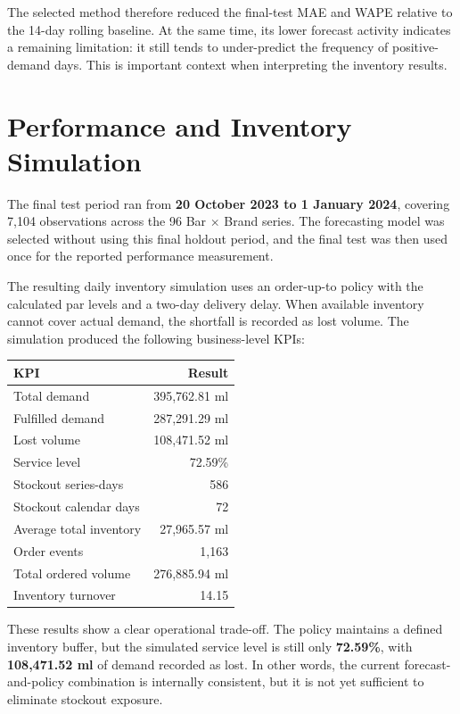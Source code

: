 \documentclass[11pt,a4paper]{article}
\begin{document}
The selected method therefore reduced the final-test MAE and WAPE relative to the 14-day rolling baseline. At the same time, its lower forecast activity indicates a remaining limitation: it still tends to under-predict the frequency of positive-demand days. This is important context when interpreting the inventory results.

\section{Performance and Inventory Simulation}

The final test period ran from \textbf{20 October 2023 to 1 January 2024}, covering 7,104 observations across the 96 Bar $\times$ Brand series. The forecasting model was selected without using this final holdout period, and the final test was then used once for the reported performance measurement.

The resulting daily inventory simulation uses an order-up-to policy with the calculated par levels and a two-day delivery delay. When available inventory cannot cover actual demand, the shortfall is recorded as lost volume. The simulation produced the following business-level KPIs:

\vspace{2pt}
\begin{center}
\small
\begin{tabularx}{0.90\textwidth}{@{}Y r@{}}
\toprule
\textbf{KPI} & \textbf{Result}\\
\midrule
Total demand & 395,762.81 ml\\
Fulfilled demand & 287,291.29 ml\\
Lost volume & 108,471.52 ml\\
Service level & 72.59\%\\
Stockout series-days & 586\\
Stockout calendar days & 72\\
Average total inventory & 27,965.57 ml\\
Order events & 1,163\\
Total ordered volume & 276,885.94 ml\\
Inventory turnover & 14.15\\
\bottomrule
\end{tabularx}
\end{center}

These results show a clear operational trade-off. The policy maintains a defined inventory buffer, but the simulated service level is still only \textbf{72.59\%}, with \textbf{108,471.52 ml} of demand recorded as lost. In other words, the current forecast-and-policy combination is internally consistent, but it is not yet sufficient to eliminate stockout exposure.
\end{document}
